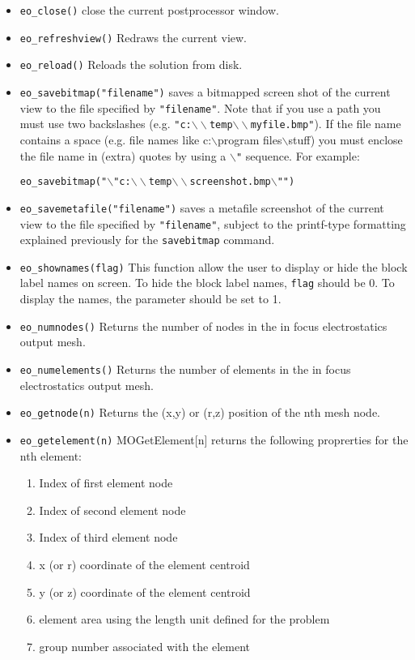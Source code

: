 \begin{itemize}

\item \texttt{eo\_close()} close the current postprocessor window.

\item{\tt eo\_refreshview()} Redraws the current view.

\item{\tt eo\_reload()} Reloads the solution from disk.

\item \texttt{eo\_savebitmap("filename")} saves a bitmapped screen shot of the current
view to the file specified by \texttt{"filename"}. Note that if you
use a path you must use two backslashes (e.g.
\texttt{"c:$\backslash \backslash $temp$\backslash \backslash
$myfile.bmp"}). If the file name contains a space (e.g. file
names like c:$\backslash $program files$\backslash $stuff) you must
enclose the file name in (extra) quotes by using a
\texttt{$\backslash $"} sequence. For example:

\texttt{eo\_savebitmap("$\backslash $"c:$\backslash \backslash
$temp$\backslash \backslash $screenshot.bmp$\backslash $"")}

\item \texttt{eo\_savemetafile("filename")} saves a metafile screenshot of the current
view to the file specified by \texttt{"filename"}, subject to the
printf-type formatting explained previously for the
\texttt{savebitmap} command.

\item \texttt{eo\_shownames(flag)} This function allow the user to display or hide the
block label names on screen. To hide the block label names,
\texttt{flag} should be 0. To display the names, the parameter
should be set to 1.

\item{\tt eo\_numnodes()} Returns the number of nodes in the in focus electrostatics output mesh.
\item{\tt eo\_numelements()} Returns the number of elements in the in focus electrostatics output mesh.
\item{\tt eo\_getnode(n)} Returns the (x,y) or (r,z) position of the nth mesh node.
\item{\tt eo\_getelement(n)} MOGetElement[n] returns the following proprerties for the nth element:
    \begin{enumerate}
        \item Index of first element node
        \item Index of second element node
        \item Index of third element node
        \item x (or r) coordinate of the element centroid
        \item y (or z) coordinate of the element centroid
        \item element area using the length unit defined for the problem
        \item group number associated with the element
    \end{enumerate}

\end{itemize}
